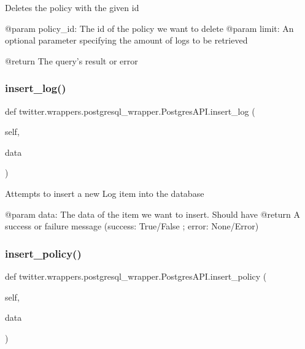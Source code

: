 \begin{DoxyVerb}Deletes the policy with the given id

@param policy_id: The id of the policy we want to delete
@param limit: An optional parameter specifying the amount of logs to be retrieved

@return The query's result or error
\end{DoxyVerb}
 \mbox{\label{classtwitter_1_1wrappers_1_1postgresql__wrapper_1_1PostgresAPI_ae0a6d7340ffc3d83829308940a296393}} 
\subsubsection{\texorpdfstring{insert\+\_\+log()}{insert\_log()}}
{\footnotesize\ttfamily def twitter.\+wrappers.\+postgresql\+\_\+wrapper.\+Postgres\+A\+P\+I.\+insert\+\_\+log (\begin{DoxyParamCaption}\item[{}]{self,  }\item[{}]{data }\end{DoxyParamCaption})}

\begin{DoxyVerb}Attempts to insert a new Log item into the database

@param data: The data of the item we want to insert. Should have
@return A success or failure message ({success: True/False ; error: None/Error})
\end{DoxyVerb}
 \mbox{\label{classtwitter_1_1wrappers_1_1postgresql__wrapper_1_1PostgresAPI_a97ea1442f99c7a75f996024dd3e3da8c}} 
\subsubsection{\texorpdfstring{insert\+\_\+policy()}{insert\_policy()}}
{\footnotesize\ttfamily def twitter.\+wrappers.\+postgresql\+\_\+wrapper.\+Postgres\+A\+P\+I.\+insert\+\_\+policy (\begin{DoxyParamCaption}\item[{}]{self,  }\item[{}]{data }\end{DoxyParamCaption})}

